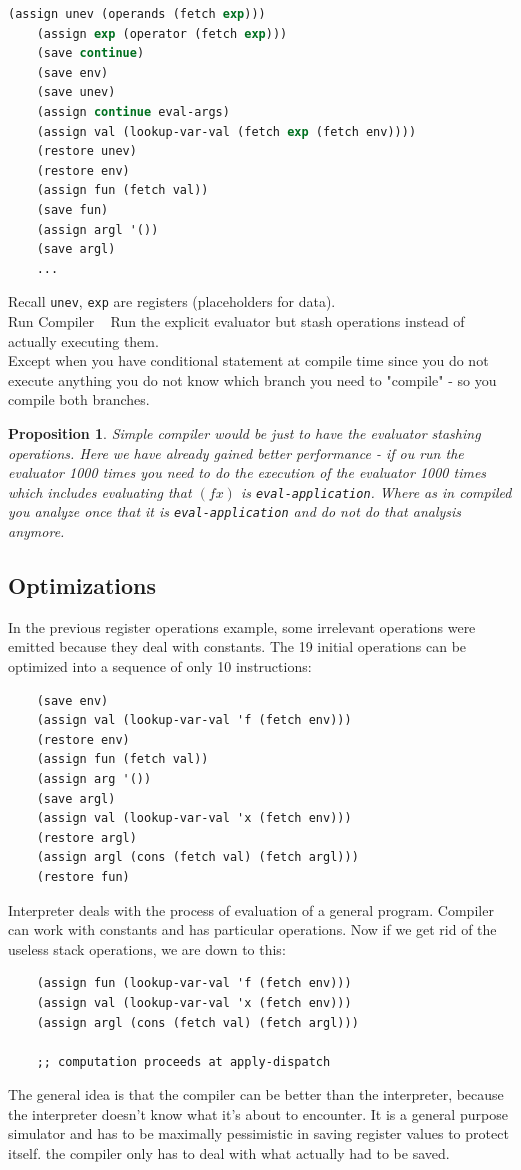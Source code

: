 \documentclass[a4paper,twoside]{article}
\newtheorem{proposition}[theorem]{Proposition}
\numberwithin{equation}{section}
\begin{document}
\begin{lstlisting}[language=Lisp]
    (assign unev (operands (fetch exp)))
    (assign exp (operator (fetch exp)))
    (save continue)
    (save env)
    (save unev)
    (assign continue eval-args)
    (assign val (lookup-var-val (fetch exp (fetch env))))
    (restore unev)
    (restore env)
    (assign fun (fetch val))
    (save fun)
    (assign argl '())
    (save argl)
    ...
\end{lstlisting}
Recall \texttt{unev}, \texttt{exp} are registers (placeholders for data).\\
Run Compiler ~ Run the explicit evaluator but stash operations instead of actually executing them. \\
Except when you have conditional statement at compile time since you do not execute anything you do not
know which branch you need to "compile" - so you compile both branches.
\begin{proposition}
    Simple compiler would be just to have the evaluator stashing operations. Here we have already gained
    better performance - if ou run the evaluator 1000 times you need to do the execution of the evaluator 1000
    times which includes evaluating that $(f x)$ is \texttt{eval-application}. Where as in compiled you
    analyze once that it is \texttt{eval-application} and do not do that analysis anymore.
\end{proposition}

\subsection{Optimizations}
In the previous register operations example, some irrelevant operations were emitted because
they deal with constants. The 19 initial operations can be optimized into a sequence of only 10 instructions:

\begin{lstlisting}
    (save env)
    (assign val (lookup-var-val 'f (fetch env)))
    (restore env)
    (assign fun (fetch val))
    (assign arg '())
    (save argl)
    (assign val (lookup-var-val 'x (fetch env)))
    (restore argl)
    (assign argl (cons (fetch val) (fetch argl)))
    (restore fun)
\end{lstlisting}

Interpreter deals with the process of evaluation of a general program. Compiler can work with constants
and has particular operations. Now if we get rid of the useless stack operations, we are down to this:
\begin{lstlisting}
    (assign fun (lookup-var-val 'f (fetch env)))
    (assign val (lookup-var-val 'x (fetch env)))
    (assign argl (cons (fetch val) (fetch argl)))
    
    ;; computation proceeds at apply-dispatch
\end{lstlisting}
The general idea is that the compiler can be better than the interpreter, because the interpreter doesn't
know what it's about to encounter. It is a general purpose simulator and has to be maximally pessimistic in
saving register values to protect itself. the compiler only has to deal with what actually had to be saved.
\end{document}
